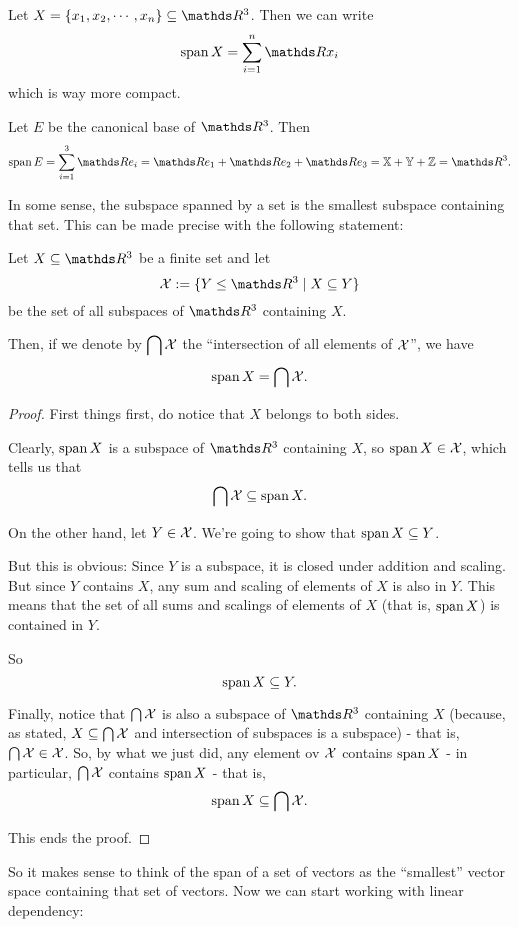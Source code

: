 \begin{ex}
	Let $X=\{x_1,x_2,\cdots,x_n\}\subseteq \R^3$. Then we can write
	\[\spen X=\sum_{i=1}^n \R x_i\]which is way more compact.
	
	Let $E$ be the canonical base of $\R^3$. Then 
	\[\spen E=\sum_{i=1}^3 \R e_i=\R e_1+\R e_2+\R e_3=\mb{X+Y+Z}=\R^3.\]
\end{ex}

In some sense, the subspace spanned by a set is the smallest subspace containing that set. This can be made precise with the following statement:

\begin{lemma}
	Let $X\subseteq\R^3$ be a finite set and let 
	\[\mc X:=\{Y\leq \R^3\mid X\subseteq Y\}\]be the set of all subspaces of $\R^3$ containing $X$.
	
	Then, if we denote by $\displaystyle\bigcap\mathcal X$ the ``intersection of all elements of $\mathcal X$'', we have
	\[\operatorname{span} X=\bigcap\mathcal X.\]
\end{lemma}
\begin{proof}
	First things first, do notice that $X$ belongs to both sides.
	
	Clearly, $\operatorname{span} X$ is a subspace of $\R^3$ containing $X$, so $\operatorname{span} X\in \mathcal X$, which tells us that $$\bigcap\mathcal X\subseteq\operatorname{span} X.$$
	
	On the other hand, let $Y\in\mathcal X$. We're going to show that $\operatorname{span} X\subseteq Y$.
	
	But this is obvious: Since $Y$ is a subspace, it is closed under addition and scaling. But since $Y$ contains $X$, any sum and scaling of elements of $X$ is also in $Y$. This means that the set of all sums and scalings of elements of $X$ (that is, $\operatorname{span} X$) is contained in $Y$.
	
	So
	\[\operatorname{span} X\subseteq Y.\]
	
	Finally, notice that $\bigcap\mathcal X$ is also a subspace of $\R^3$ containing $X$ (because, as stated, $X\subseteq\bigcap\mathcal X$ and intersection of subspaces is a subspace) - that is, $\bigcap \mathcal X\in \mathcal X$. So, by what we just did, any element ov $\mathcal X$ contains $\operatorname{span} X$ - in particular, $\bigcap\mathcal X$ contains $\operatorname{span} X$ - that is,
	\[\operatorname{span} X\subseteq\bigcap\mathcal X.\]
	
	This ends the proof.
	
\end{proof}

So it makes sense to think of the span of a set of vectors as the ``smallest'' vector space containing that set of vectors. Now we can start working with linear dependency:

